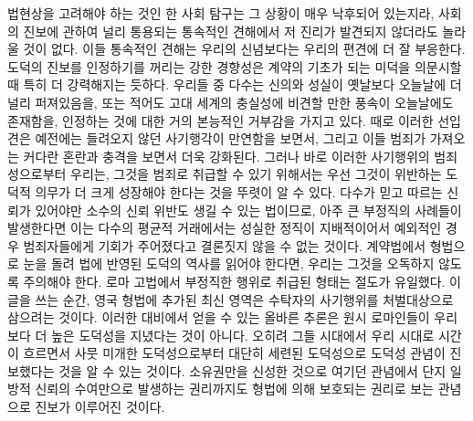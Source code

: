 법현상을 고려해야 하는 것인 한
사회 탐구는 그 상황이 매우 낙후되어 있는지라,
사회의 진보에 관하여 널리 통용되는
통속적인 견해에서 저 진리가
발견되지 않더라도 놀라울 것이 없다.
이들 통속적인 견해는
우리의 신념보다는 우리의 편견에 더 잘 부응한다.
도덕의 진보를 인정하기를 꺼리는 강한 경향성은
계약의 기초가 되는 미덕을 의문시할 때
특히 더 강력해지는 듯하다.
우리들 중 다수는
신의와 성실이 옛날보다 오늘날에 더 널리 퍼져있음을,
또는 적어도 고대 세계의 충실성에 비견할 만한 풍속이 오늘날에도 존재함을,
인정하는 것에 대한
거의 본능적인 거부감을 가지고 있다.
때로 이러한 선입견은
예전에는 들려오지 않던
사기행각이 만연함을 보면서,
그리고 이들 범죄가 가져오는 커다란 혼란과 충격을 보면서
더욱 강화된다.
그러나 바로 이러한 사기행위의 범죄성으로부터 우리는,
그것을 범죄로 취급할 수 있기 위해서는
우선
그것이 위반하는 도덕적 의무가 더 크게 성장해야 한다는 것을
뚜렷이 알 수 있다.
다수가 믿고 따르는 신뢰가 있어야만
소수의 신뢰 위반도 생길 수 있는 법이므로,
아주 큰 부정직의 사례들이 발생한다면 이는
다수의 평균적 거래에서는 성실한 정직이 지배적이어서
예외적인 경우 범죄자들에게 기회가 주어졌다고
결론짓지 않을 수 없는 것이다.
계약법에서 형법으로 눈을 돌려
법에 반영된 도덕의 역사를 읽어야 한다면,
우리는 그것을 오독하지 않도록 주의해야 한다.
로마 고법에서 부정직한 행위로 취급된 형태는
절도가 유일했다.
이 글을 쓰는 순간,
영국 형법에 추가된 최신 영역은
수탁자의 사기행위를 처벌대상으로 삼으려는 것이다.
이러한 대비에서 얻을 수 있는 올바른 추론은
원시 로마인들이 우리보다 더 높은 도덕성을 지녔다는 것이 아니다.
오히려 그들 시대에서 우리 시대로 시간이 흐르면서
사뭇 미개한 도덕성으로부터 대단히 세련된 도덕성으로
도덕성 관념이 진보했다는 것을 알 수 있는 것이다.
소유권만을 신성한 것으로 여기던 관념에서
단지 일방적 신뢰의 수여만으로 발생하는 권리까지도
형법에 의해 보호되는 권리로 보는 관념으로 진보가 이루어진 것이다.

